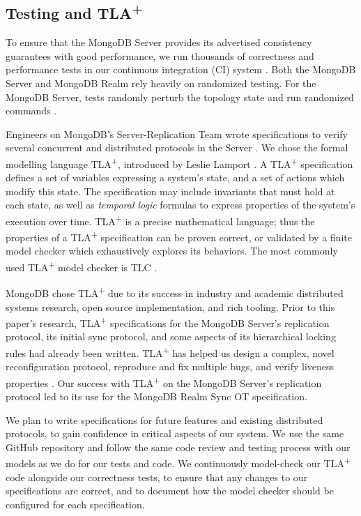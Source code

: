 \documentclass{vldb}
\begin{document}
\subsection{Testing and TLA\textsuperscript{+}}
\label{subsec:background_testing_tla}

To ensure that the MongoDB Server provides its advertised consistency guarantees with good performance, we run thousands of correctness and performance tests in our continuous integration (CI) system \cite{Daly19iChangePointMongoDB}.
Both the MongoDB Server and MongoDB Realm rely heavily on randomized testing.
For the MongoDB Server, tests randomly perturb the topology state and run randomized commands \cite{Guo17MongoDBFuzzTester}.

Engineers on MongoDB's Server-Replication Team wrote specifications to verify several concurrent and distributed protocols in the Server \cite{Schultz19BugsLife}.
We chose the formal modelling language TLA\textsuperscript{+}, introduced by Leslie Lamport \cite{Lamport99TLAPlus, Lamport02SpecifyingSystems}.
A TLA\textsuperscript{+} specification defines a set of variables expressing a system's state, and a set of actions which  modify this state.
The specification may include invariants that must hold at each state, as well as \textit{temporal logic} formulas to express properties of the system's execution over time.
TLA\textsuperscript{+} is a precise mathematical language; thus the properties of a TLA\textsuperscript{+} specification can be proven correct, or validated by a finite model checker which exhaustively explores its behaviors.
The most commonly used TLA\textsuperscript{+} model checker is TLC \cite{TLC}.

MongoDB chose TLA\textsuperscript{+} due to its success in industry and academic distributed systems research, open source implementation, and rich tooling.
Prior to this paper's research, TLA\textsuperscript{+} specifications for the MongoDB Server's replication protocol, its initial sync protocol, and some aspects of its hierarchical locking rules had already been written.
TLA\textsuperscript{+} has helped us design a complex, novel reconfiguration protocol, reproduce and fix multiple bugs, and verify liveness properties \cite{Schultz19BugsLife}.
Our success with TLA\textsuperscript{+} on the MongoDB Server's replication protocol led to its use for the MongoDB Realm Sync OT specification.

We plan to write specifications for future features and existing distributed protocols, to gain confidence in critical aspects of our system.
We use the same GitHub repository and follow the same code review and testing process with our models as we do for our tests and code.
We continuously model-check our TLA\textsuperscript{+} code alongside our correctness tests, to ensure that any changes to our specifications are correct, and to document how the model checker should be configured for each specification.
\end{document}
